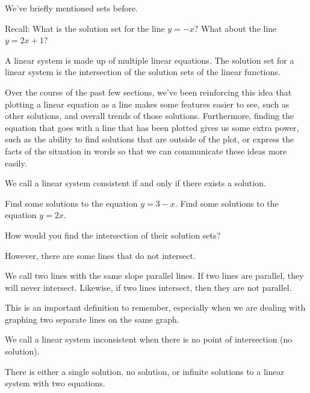 We've briefly mentioned sets before.

Recall: What is the solution set for the line $y=-x$? What about the line $y=2x+1$?


\begin{defn}
A linear system is made up of multiple linear equations. The solution set for a linear system is the intersection of the solution sets of the linear functions. 
\end{defn}

Over the course of the past few sections, we've been reinforcing this idea that plotting a linear equation as a line makes some features easier to see, such as other solutions, and overall trends of those solutions.  Furthermore, finding the equation that goes with a line that has been plotted gives us some extra power, such as the ability to find solutions that are outside of the plot, or express the facts of the situation in words so that we can communicate these ideas more easily.

\begin{defn}
We call a linear system consistent if and only if there exists a solution.	
\end{defn}

\begin{prblm}
Find some solutions to the equation $y = 3 - x$.
Find some solutions to the equation $y = 2x$.

How would you find the intersection of their solution sets?

\vspace{5.5cm}
\end{prblm}

However, there are some lines that do not intersect.

\begin{defn}
We call two lines with the same slope parallel lines. If two lines are parallel, they will never intersect. Likewise, if two lines intersect, then they are not parallel. 	
\end{defn}
This is an important definition to remember, especially when we are dealing with graphing two separate lines on the same graph.

\begin{defn}
We call a linear system inconsistent when there is no point of intersection (no solution).	
\end{defn}

\begin{theorem}
There is either a single solution, no solution, or infinite solutions to a linear system with two equations. 	
\end{theorem}


